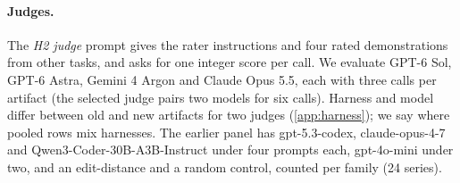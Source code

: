 \paragraph{Judges.}
The \emph{H2 judge} prompt gives the rater instructions and four rated demonstrations from other tasks, and asks for one integer score per call.
We evaluate GPT-6 Sol, GPT-6 Astra, Gemini 4 Argon and Claude Opus 5.5, each with three calls per artifact (the selected judge pairs two models for six calls).
Harness and model differ between old and new artifacts for two judges (\cref{app:harness}); we say where pooled rows mix harnesses.
The earlier panel has gpt-5.3-codex, claude-opus-4-7 and Qwen3-Coder-30B-A3B-Instruct under four prompts each, gpt-4o-mini under two, and an edit-distance and a random control, counted per family (24 series).
